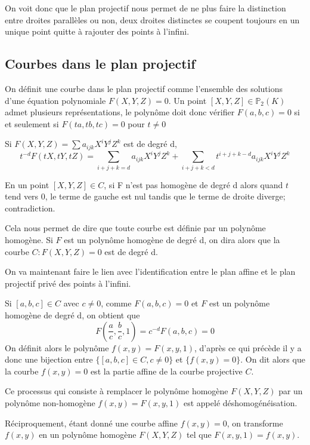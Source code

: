 \documentclass{article}
\begin{document}
On voit donc que le plan projectif nous permet de ne plus faire la distinction entre droites parallèles ou non,
deux droites distinctes se coupent toujours en un unique point quitte à rajouter des points à l'infini.

\subsection{Courbes dans le plan projectif}
On définit une courbe dans le plan projectif comme l'ensemble des solutions d'une équation polynomiale $F(X,Y,Z)=0$.
Un point $[X, Y, Z]\in \mathbb{P}_{2}(K)$ admet plusieurs représentations, le polynôme doit donc vérifier
$F(a,b,c)=0$ si et seulement si $F(ta,tb,tc)=0$ pour $t\neq 0$

Si $F(X,Y,Z)=\sum{a_{ijk}X^{i}Y^{j}Z^{k}}$ est de degré d, 
\begin{equation*}
t^{-d}F(tX, tY, tZ) = \sum_{i+j+k=d}{a_{ijk}X^{i}Y^{j}Z^{k}} + 
\sum_{i+j+k < d}{t^{i+j+k-d}a_{ijk}X^{i}Y^{j}Z^{k}}
\end{equation*}

En un point $[X,Y,Z] \in C$, si F n'est pas homogène de degré d alors quand $t$ tend vers 0, le terme de gauche 
est nul tandis que le terme de droite diverge; contradiction.

Cela nous permet de dire que toute courbe est définie par un polynôme homogène. Si $F$ est un polynôme
homogène de degré d, on dira alors que la courbe $C: F(X,Y,Z)=0$ est de degré d.

On va maintenant faire le lien avec l'identification entre le plan affine 
et le plan projectif privé des points à l'infini.

Si $[a,b,c]\in C$ avec $c\neq 0$, comme $F(a,b,c)=0$ et $F$ est un polynôme homogène de degré d, on obtient que
\begin{equation*}
F(\frac{a}{c}, \frac{b}{c}, 1)=c^{-d}F(a,b,c)=0
\end{equation*}
On définit alors le polynôme $f(x,y)=F(x,y,1)$,
d'après ce qui précède il y a donc une bijection entre $\{[a,b,c]\in C, c\neq 0\}$ et $\{f(x,y)=0\}$.
On dit alors que la courbe $f(x,y)=0$ est la partie affine de la courbe projective $C$.

Ce processus qui consiste à remplacer le polynôme homogène $F(X,Y,Z)$ par un polynôme non-homogène
$f(x,y)=F(x,y,1)$ est appelé déshomogénéisation.

Réciproquement, étant donné une courbe affine $f(x,y)=0$, on transforme $f(x,y)$ en un polynôme homogène $F(X,Y,Z)$ tel que
$F(x,y,1)=f(x,y)$.
\end{document}
